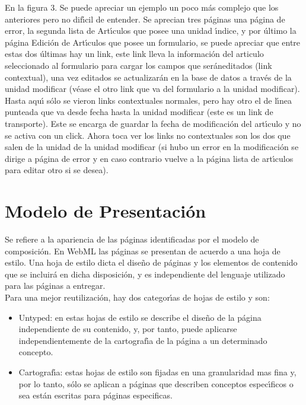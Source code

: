 En la figura 3. Se puede apreciar un ejemplo un poco m\'as complejo que los 
anteriores pero no dif\'{\i}cil de entender. Se aprecian tres p\'aginas una p\'agina de
error, la segunda lista de Art\'{\i}culos que posee una unidad \'{\i}ndice, y por \'ultimo
la p\'agina Edici\'on de Art\'{\i}culos que posee un formulario, se puede apreciar que
entre estas dos \'ultimas hay un link, este link lleva la informaci\'on del 
articulo seleccionado al formulario para cargar los campos que ser\'aneditados
(link contextual), una vez editados se actualizar\'an en la base de datos a
trav\'es de la unidad modificar (v\'ease el otro link que va del formulario a la
unidad modificar). Hasta aqu\'{\i} s\'olo se vieron links contextuales normales, pero
hay otro el de l\'{\i}nea punteada que va desde fecha hasta la unidad modificar
(este es un link de transporte). Este se encarga de guardar la fecha de 
modificaci\'on del art\'{\i}culo y no se activa con un click. Ahora toca ver los
links no contextuales son los dos que salen de la unidad de la unidad modificar
(si hubo un error en la modificaci\'on se dirige a p\'agina de error y en caso
contrario vuelve a la p\'agina lista de art\'{\i}culos para editar otro si se desea).

\section{Modelo de Presentaci\'on}

Se refiere a la apariencia de las p\'aginas identificadas por el modelo de 
composici\'on. En WebML las p\'aginas se presentan de acuerdo a una hoja de estilo.
Una hoja de estilo dicta el dise\~no de p\'aginas y los elementos de contenido que 
se incluir\'a en dicha disposici\'on, y es independiente del lenguaje utilizado
para las p\'aginas a entregar. \\[0.5cm]

Para una mejor reutilizaci\'on, hay dos categor\'{\i}as de hojas de estilo y son:
\\[0.5cm]

\begin{itemize}
    \item Untyped: en estas hojas de estilo se describe el dise\~no de la 
        p\'agina independiente de su contenido, y, por tanto, puede aplicarse 
        independientemente de la cartograf\'{\i}a de la p\'agina a un determinado
        concepto.        
    \item Cartograf\'{\i}a: estas hojas de estilo son fijadas en una granularidad
        mas fina y, por lo tanto, s\'olo se aplican a p\'aginas que describen
        conceptos espec\'{\i}ficos o sea est\'an escritas para p\'aginas especificas.
\end{itemize}

